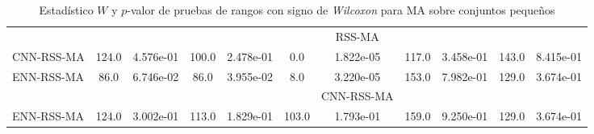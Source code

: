 \begin{table}[]
\begin{adjustbox}{max width =\textwidth}
\begin{tabular}{l c c c c c c c c c c}
\hline

 & & & & & & RSS-MA & & & & \\
CNN-RSS-MA  & 124.0 & 4.576e-01 & 100.0 & 2.478e-01 & 0.0 & 1.822e-05 & 117.0 & 3.458e-01 & 143.0 & 8.415e-01 \\ 
ENN-RSS-MA & 86.0 & 6.746e-02 & 86.0 & 3.955e-02 & 8.0 & 3.220e-05 & 153.0 & 7.982e-01 & 129.0 & 3.674e-01 \\  

\hline

 & & & & & & CNN-RSS-MA & & & & \\ 
ENN-RSS-MA & 124.0 & 3.002e-01 & 113.0 & 1.829e-01 & 103.0 & 1.793e-01 & 159.0 & 9.250e-01 & 129.0 & 3.674e-01 \\ 

\hline 

\end{tabular}
\end{adjustbox}
\caption[Pruebas de \emph{Wilcoxon} entre MA y variaciones para conjuntos pequeños]{Estadístico $W$ y $p$-valor de pruebas de rangos con signo de \emph{Wilcoxon} para MA sobre conjuntos pequeños}
\label{wilcox-MA-peq}
\end{table}

